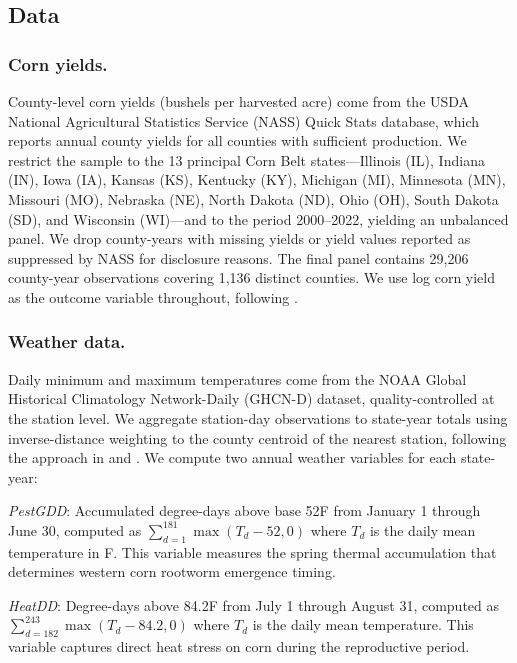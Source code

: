 \documentclass[12pt]{article}
\begin{document}
\subsection{Data}

\subsubsection*{Corn yields.}
County-level corn yields (bushels per harvested acre) come from the USDA National Agricultural Statistics Service (NASS) Quick Stats database, which reports annual county yields for all counties with sufficient production. We restrict the sample to the 13 principal Corn Belt states---Illinois (IL), Indiana (IN), Iowa (IA), Kansas (KS), Kentucky (KY), Michigan (MI), Minnesota (MN), Missouri (MO), Nebraska (NE), North Dakota (ND), Ohio (OH), South Dakota (SD), and Wisconsin (WI)---and to the period 2000--2022, yielding an unbalanced panel. We drop county-years with missing yields or yield values reported as suppressed by NASS for disclosure reasons. The final panel contains 29,206 county-year observations covering 1,136 distinct counties. We use log corn yield as the outcome variable throughout, following \citet{schlenker2009nonlinear}.

\subsubsection*{Weather data.}
Daily minimum and maximum temperatures come from the NOAA Global Historical Climatology Network-Daily (GHCN-D) dataset, quality-controlled at the station level. We aggregate station-day observations to state-year totals using inverse-distance weighting to the county centroid of the nearest station, following the approach in \citet{schlenker2009nonlinear} and \citet{deschenes2007economic}. We compute two annual weather variables for each state-year:

\textit{PestGDD}: Accumulated degree-days above base 52\textdegree{}F from January 1 through June 30, computed as $\sum_{d=1}^{181} \max(T_d - 52, 0)$ where $T_d$ is the daily mean temperature in \textdegree{}F. This variable measures the spring thermal accumulation that determines western corn rootworm emergence timing.

\textit{HeatDD}: Degree-days above 84.2\textdegree{}F from July 1 through August 31, computed as $\sum_{d=182}^{243} \max(T_d - 84.2, 0)$ where $T_d$ is the daily mean temperature. This variable captures direct heat stress on corn during the reproductive period.
\end{document}

